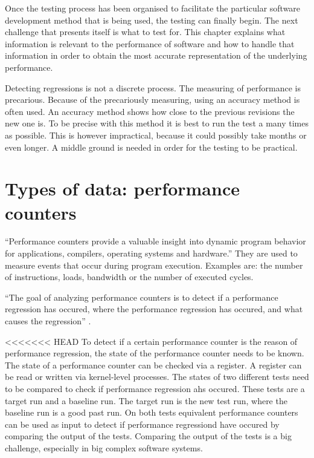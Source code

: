 Once the testing process has been organised to facilitate the particular software development method that is being used, the testing can finally begin. The next challenge that presents itself is what to test for. This chapter explains what information is relevant to the performance of software and how to handle that information in order to obtain the most accurate representation of the underlying performance.

Detecting regressions is not a discrete process. The measuring of performance is precarious. Because of the precariously measuring, using an accuracy method is often used. An accuracy method shows how close to the previous revisions the new one is. To be precise with this method it is best to run the test a many times as possible. This is however impractical, because it could possibly take months or even longer. A middle ground is needed in order for the testing to be practical.

\section{Types of data: performance counters}
``Performance counters provide a valuable insight into dynamic program behavior for applications, compilers, operating systems and hardware.''\cite{zagha1996performance}
They are used to measure events that occur during program execution. Examples are: the number of instructions, loads, bandwidth or the number of executed cycles.

``The goal of analyzing performance counters is to detect if a performance regression has occured, where the performance regression has occured, and what causes the regression'' \cite{nguyen2012using}.

<<<<<<< HEAD
To detect if a certain performance counter is the reason of performance regression, the state of the performance counter needs to be known. The state of a performance counter can be checked via a register. A register can be read or written via kernel-level processes. The states of two different tests need to be compared to check if performance regression ahs occured. These tests are a target run and a baseline run. The target run is the new test run, where the baseline run is a good past run. On both tests equivalent performance counters can be used as input to detect if performance regressiond have occured by comparing the output of the tests. Comparing the output of the tests is a big challenge, especially in big complex software systems.

